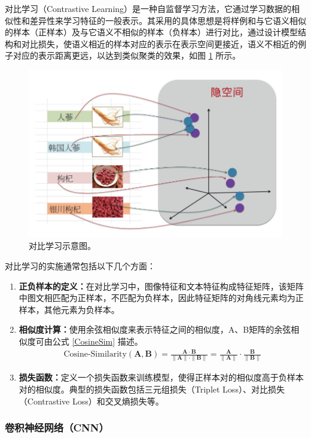 \documentclass[a4paper]{zreport}
\begin{document}
对比学习（Contrastive Learning）是一种自监督学习方法\cite{liu2021self}，它通过学习数据的相似性和差异性来学习特征的一般表示。其采用的具体思想是将样例和与它语义相似的样本（正样本）及与它语义不相似的样本（负样本）进行对比，通过设计模型结构和对比损失，使语义相近的样本对应的表示在表示空间更接近，语义不相近的例子对应的表示距离更远，以达到类似聚类的效果，如图 \ref{fig:cl1} 所示。

\begin{figure}[h]
\centering
\includegraphics[width=0.75\linewidth]{figures/cl1}
\caption{对比学习示意图。}
\label{fig:cl1}
\end{figure}

对比学习的实施通常包括以下几个方面：
\begin{enumerate}
\item \textbf{正负样本的定义：}在对比学习中，图像特征和文本特征构成特征矩阵，该矩阵中图文相匹配为正样本，不匹配为负样本，因此特征矩阵的对角线元素均为正样本，其他元素为负样本。
\item \textbf{相似度计算：}使用余弦相似度来表示特征之间的相似度，A、B矩阵的余弦相似度可由公式 \eqref{CosineSim} 描述。
\begin{gather}
\text{Cosine-Similarity}(\mathbf{A}, \mathbf{B})
= {\frac{\mathbf{A} \cdot \mathbf{B}} {\| \mathbf{A} \| \cdot \| \mathbf{B} \|}}
= \frac{\mathbf{A}}{\| \mathbf{A} \|} \cdot \frac{\mathbf{B}}{\| \mathbf{B} \|}
\label{CosineSim}
\end{gather}
\item \textbf{损失函数：}定义一个损失函数来训练模型，使得正样本对的相似度高于负样本对的相似度。典型的损失函数包括三元组损失（Triplet Loss）、对比损失（Contrastive Loss）和交叉熵损失等。
\end{enumerate}

\subsubsection{卷积神经网络（CNN）}
\end{document}

